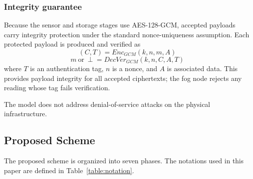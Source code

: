 \documentclass[conference]{IEEEtran}
\begin{document}
    \subsubsection{Integrity guarantee} Because the sensor and storage stages use AES-128-GCM, accepted payloads carry integrity protection under the standard nonce-uniqueness assumption. Each protected payload is produced and verified as
    \begin{equation}
    (C, T) = Enc_{GCM}(k, n, m, A)
    \end{equation}
    \begin{equation}
    m\ \text{or}\ \perp = DecVer_{GCM}(k, n, C, A, T)
    \end{equation}
    where $T$ is an authentication tag, $n$ is a nonce, and $A$ is associated data. This provides payload integrity for all accepted ciphertexts; the fog node rejects any reading whose tag fails verification.

    The model does not address denial-of-service attacks on the physical infrastructure.

    \subsection{Proposed Scheme}
    The proposed scheme is organized into seven phases. The notations used in this paper are defined in Table~\ref{table:notation}.
\end{document}

